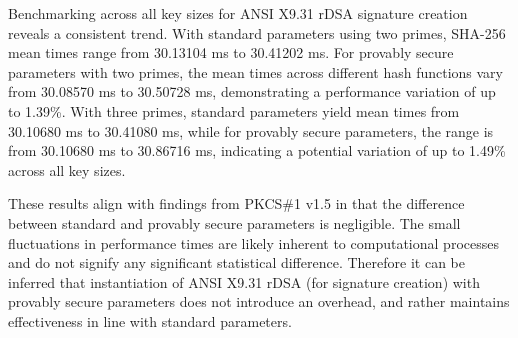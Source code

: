 \documentclass[]{final_report}
\theoremstyle{definition}
\begin{document}

Benchmarking across all key sizes for ANSI X9.31 rDSA signature creation reveals a consistent trend. With standard parameters using two primes, SHA-256 mean times range from 30.13104 ms to 30.41202 ms. For provably secure parameters with two primes, the mean times across different hash functions vary from 30.08570 ms to 30.50728 ms, demonstrating a performance variation of up to 1.39\%. With three primes, standard parameters yield mean times from 30.10680 ms to 30.41080 ms, while for provably secure parameters, the range is from 30.10680 ms to 30.86716 ms, indicating a potential variation of up to 1.49\% across all key sizes.


These results align with findings from PKCS\#1 v1.5 in that the difference between standard and provably secure parameters is negligible. The small fluctuations in performance times are likely inherent to computational processes and do not signify any significant statistical difference. Therefore it can be inferred that instantiation of ANSI X9.31 rDSA (for signature creation) with provably secure parameters does not introduce an overhead, and rather maintains effectiveness in line with standard parameters.
\end{document}
